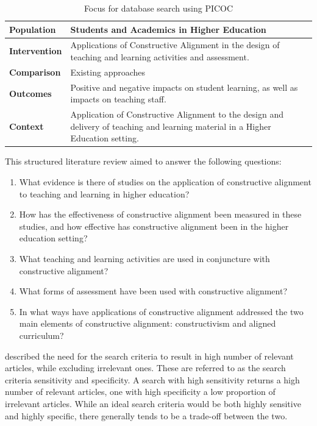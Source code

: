 \begin{table}[t]
	\centering
	\caption{Focus for database search using PICOC}
	\label{tbl:picoc}

    \begin{tabular}{|l|p{9cm}|}
    \hline
    \textbf{Population} & Students and Academics in Higher Education\\ \hline
    \textbf{Intervention} & Applications of Constructive Alignment in the design of teaching and learning activities and assessment. \\ \hline
    \textbf{Comparison} & Existing approaches \\ \hline
    \textbf{Outcomes} & Positive and negative impacts on student learning, as well as impacts on teaching staff. \\ \hline
    \textbf{Context} & Application of Constructive Alignment to the design and delivery of teaching and learning material in a Higher Education setting. \\ \hline
    \end{tabular}
\end{table}


This structured literature review aimed to answer the following questions:

\begin{enumerate}
	\item What evidence is there of studies on the application of constructive alignment to teaching and learning in higher education?
	\item How has the effectiveness of constructive alignment been measured in these studies, and how effective has constructive alignment been in the higher education setting?
	\item What teaching and learning activities are used in conjuncture with constructive alignment?
	\item What forms of assessment have been used with constructive alignment?
	\item In what ways have applications of constructive alignment addressed the two main elements of constructive alignment: constructivism and aligned curriculum?
\end{enumerate}

\citet{Petticrew:2008} described the need for the search criteria to result in high number of relevant articles, while excluding irrelevant ones. These are referred to as the search criteria sensitivity and specificity. A search with high sensitivity returns a high number of relevant articles, one with high specificity a low proportion of irrelevant articles. While an ideal search criteria would be both highly sensitive and highly specific, there generally tends to be a trade-off between the two. 

